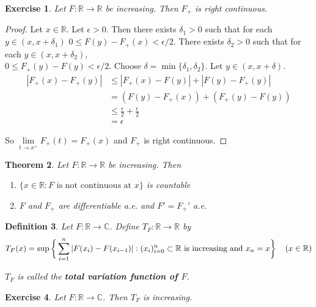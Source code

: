 \documentclass[12pt]{amsart}
\newtheorem{thm}{Theorem}[subsection]
\newtheorem{defn}[thm]{Definition}
\newtheorem{ex}[thm]{Exercise}
\newcommand{\del}{\delta}
\newcommand{\ep}{\epsilon}
\newcommand{\C}{\mathbb{C}}
\newcommand{\R}{\mathbb{R}}
\begin{document}
	\begin{ex}
		Let $F:\R \rightarrow \R$ be increasing. Then $F_+$ is right continuous. 
	\end{ex}
	
	\begin{proof}
		Let $x \in \R$. Let $\ep >0$. Then there exists $\del_1>0$ such that for each $y \in (x,x+\del_1)$ $0 \leq F(y)-F_+(x) < \ep/2$. There exists $\del_2 >0$ such that for each $y \in (x,x+\del_2)$, \\$0 \leq F_+(y)-F(y) < \ep/2$. Choose $\del = \min\{\del_1, \del_2\}$. Let $y \in (x, x+\del)$.
		\begin{align*}
			|F_+(x) - F_+(y)|
			& \leq |F_+(x) - F(y)| + |F(y)- F_+(y)| \\
			& = (F(y) - F_+(x)) + (F_+(y) - F(y)) \\
			& \leq \frac{\ep}{2} + \frac{\ep}{2}\\
			& = \ep
		\end{align*}
		
		So $\lim\limits_{t \rightarrow x^+} F_+(t) = F_+(x)$ and $F_+$ is right continuous.
	\end{proof}
	
	\begin{thm}
		Let $F:\R \rightarrow \R$ be increasing. Then 
		\begin{enumerate}
			\item $\{x \in \R: F \text{ is not continuous at }x\}$ is countable
			\item $F$ and $F_+$ are differentiable a.e. and $F' = F_+'$ a.e.
		\end{enumerate}
	\end{thm}
	
	\begin{defn}
		Let $F:\R \rightarrow \C$. Define $T_F:\R \rightarrow \R$ by $$T_F(x) = \sup\bigg \{\sum_{i=1}^{n}|F(x_{i}) - F(x_{i-1})|: (x_i)_{i=0}^n \subset \R \text{ is increasing and } x_n=x  \bigg \} \hspace{4mm} (x \in \R)$$
		
		$T_F$ is called the \textbf{total variation function of $F$}.
	\end{defn}
	
	\begin{ex}
		Let $F:\R \rightarrow \C$. Then $T_F$ is increasing.
	\end{ex}
	
\end{document}
